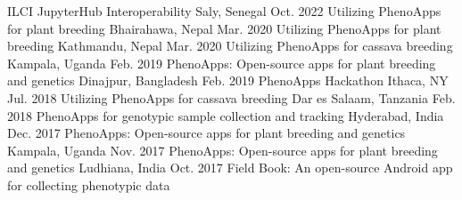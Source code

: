 
\begin{cvworkshops}

  \cvworkshop
    {ILCI JupyterHub Interoperability} %
    {Saly, Senegal} %
    {Oct. 2022} %
  \cvworkshop
    {Utilizing PhenoApps for plant breeding} %
    {Bhairahawa, Nepal} %
    {Mar. 2020} %
  \cvworkshop
    {Utilizing PhenoApps for plant breeding} %
    {Kathmandu, Nepal} %
    {Mar. 2020} %
  \cvworkshop
    {Utilizing PhenoApps for cassava breeding} %
    {Kampala, Uganda} %
    {Feb. 2019} %
  \cvworkshop
    {PhenoApps: Open-source apps for plant breeding and genetics} %
    {Dinajpur, Bangladesh} %
    {Feb. 2019} %
  \cvworkshop
    {PhenoApps Hackathon} %
    {Ithaca, NY} %
    {Jul. 2018} %
  \cvworkshop
    {Utilizing PhenoApps for cassava breeding} %
    {Dar es Salaam, Tanzania} %
    {Feb. 2018} %
  \cvworkshop
    {PhenoApps for genotypic sample collection and tracking} %
    {Hyderabad, India} %
    {Dec. 2017} %
  \cvworkshop
    {PhenoApps: Open-source apps for plant breeding and genetics} %
    {Kampala, Uganda} %
    {Nov. 2017} %
  \cvworkshop
    {PhenoApps: Open-source apps for plant breeding and genetics} %
    {Ludhiana, India} %
    {Oct. 2017} %
  \cvworkshop
    {Field Book: An open-source Android app for collecting phenotypic data} %

\end{cvworkshops}

